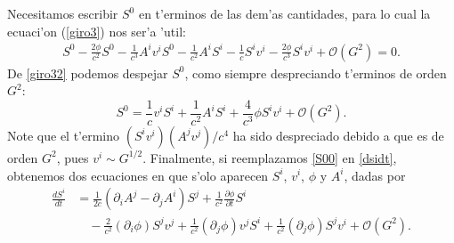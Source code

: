 Necesitamos escribir $S^0$ en t'erminos de las dem'as cantidades, para lo cual la ecuaci'on (\ref{giro3}) nos ser'a 'util:
\begin{align}
S^0-\frac{2\phi}{c^2}S^0-\frac{1}{c^3}A^iv^iS^0-\frac{1}{c^2}A^iS^i-\frac{1}{c}S^iv^i-\frac{2\phi}{c^3}S^iv^i+\mathcal{O}(G^2)=0.\label{giro32}
\end{align}
De \eqref{giro32} podemos despejar $S^0$, como siempre despreciando t'erminos de orden $G^2$:
\begin{equation}
S^0=\frac{1}{c}v^iS^i+\frac{1}{c^2}A^iS^i+\frac{4}{c^3}\phi S^iv^i+\mathcal{O}(G^2).\label{S00}
\end{equation}
Note que el t'ermino $(S^iv^i)(A^jv^j)/c^4$ ha sido despreciado debido a que es de orden $G^2$, pues $v^i\sim G^{1/2}$. 
Finalmente, si reemplazamos \eqref{S00} %
en \eqref{dsidt}, %
obtenemos dos ecuaciones en que s'olo aparecen $S^i$, $v^i$, $\phi$ y $A^i$, dadas por
\begin{align}
\frac{dS^{i}}{dt} &= \frac{1}{2c}\left(\partial_iA^j-\partial_jA^i\right)S^j+\frac{1}{c^2}\frac{\partial \phi}{\partial t}S^i \nonumber \\
&\quad  -\frac{2}{c^2}(\partial_i\phi) S^jv^j+\frac{1}{c^2}(\partial_j\phi)v^jS^i+\frac{1}{c^2}(\partial_j\phi)S^jv^i+\mathcal{O}(G^2).\label{dsidt2}
\end{align}
